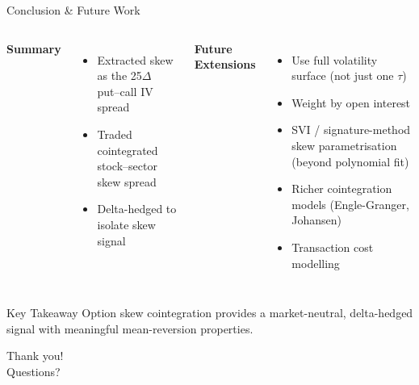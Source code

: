 \documentclass{beamer}
\begin{document}
\begin{frame}{Conclusion \& Future Work}
  \begin{columns}
      \textbf{Summary}
      \begin{itemize}
        \item Extracted skew as the 25$\Delta$ put--call IV spread
        \item Traded cointegrated stock--sector skew spread
        \item Delta-hedged to isolate skew signal
      \end{itemize}
      \textbf{Future Extensions}
      \begin{itemize}
        \item Use full volatility surface (not just one $\tau$)
        \item Weight by open interest
        \item SVI / signature-method skew parametrisation (beyond polynomial fit)
        \item Richer cointegration models (Engle-Granger, Johansen)
        \item Transaction cost modelling
      \end{itemize}
  \end{columns}
  \vspace{1em}
  \begin{block}{Key Takeaway}
    Option skew cointegration provides a market-neutral, delta-hedged
    signal with meaningful mean-reversion properties.
  \end{block}
\end{frame}

\begin{frame}
  \centering
  \Large Thank you!\\[1em]
  \normalsize Questions?
\end{frame}
\end{document}
